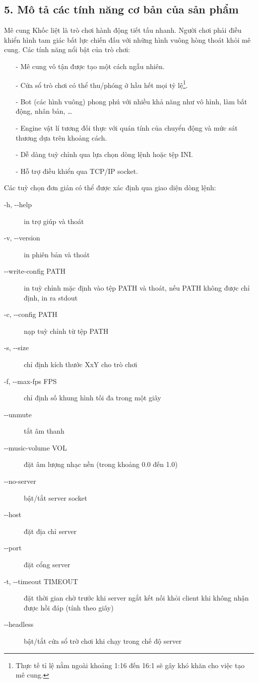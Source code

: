 \documentclass[a4paper,12pt]{article}
\begin{document}
\subsection*{5. Mô tả các tính năng cơ bản của sản phẩm}
Mê cung Khốc liệt là trò chơi hành động tiết tấu nhanh. Người chơi phải điều
khiển hình tam giác bất lực chiến đấu với những hình vuông hòng thoát khỏi mê
cung. Các tính năng nổi bật của trò chơi:

\newpage
\begin{itemize}
  \item[-] Mê cung vô tận được tạo một cách ngẫu nhiên.
  \item[-] Cửa sổ trò chơi có thể thu/phóng ở hầu hết mọi tỷ lệ\footnote{Thực tế
    tỉ lệ nằm ngoài khoảng 1:16 đến 16:1 sẽ gây khó khăn cho việc tạo mê cung.}.
  \item[-] Bot (các hình vuông) phong phú với nhiều khả năng như vô hình, làm
    bất động, nhân bản, \ldots
  \item[-] Engine vật lí tương đối thực với quán tính của chuyển động và mức sát
    thương dựa trên khoảng cách.
  \item[-] Dễ dàng tuỳ chỉnh qua lựa chọn dòng lệnh hoặc tệp INI.
  \item[-] Hỗ trợ điều khiển qua TCP/IP socket.
\end{itemize}
Các tuỳ chọn đơn giản có thể được xác định qua giao diện dòng lệnh:
\begin{description}
  \item[-h, -{}-help] in trợ giúp và thoát
  \item[-v, -{}-version] in phiên bản và thoát
  \item[-{}-write-config \lbrack PATH\rbrack ] in tuỳ chỉnh mặc định vào tệp PATH
    và thoát, nếu PATH không được chỉ định, in ra stdout
  \item[-c, -{}-config PATH] nạp tuỳ chỉnh từ tệp PATH
  \item[-s, -{}-size] chỉ định kích thước XxY cho trò chơi
  \item[-f, -{}-max-fps FPS] chỉ định số khung hình tối đa trong một giây
  \item[-{}-\lbrack un\rbrack mute] tắt âm thanh
  \item[-{}-music-volume VOL] đặt âm lượng nhạc nền (trong khoảng 0.0 đến 1.0)
  \item[-{}-\lbrack no-\rbrack server] bật/tắt server socket
  \item[-{}-host] đặt địa chỉ server
  \item[-{}-port] đặt cổng server
  \item[-t, -{}-timeout TIMEOUT] đặt thời gian chờ trước khi server ngắt kết nối
    khỏi client khi không nhận được hồi đáp (tính theo giây)
  \item[-{}-head\lbrack less\rbrack] bật/tắt cửa sổ trờ chơi khi chạy trong chế
    độ server
\end{description}
\end{document}

